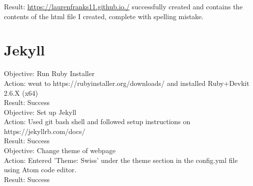\documentclass{article}
\begin{document}
\noindent Result: \href{https://laurenfranks11.github.io./}{https://laurenfranks11.github.io./} successfully created and contains the contents of the html file I created, complete with spelling mistake.\\ 

\section{Jekyll}
Objective: Run Ruby Installer \\
Action: went to https://rubyinstaller.org/downloads/ and installed Ruby+Devkit 2.6.X (x64)  \\
Result: Success\\

Objective: Set up Jekyll\\
Action: Used git bash shell and followed setup instructions on https://jekyllrb.com/docs/ \\
Result: Success\\

Objective: Change theme of webpage\\
Action: Entered 'Theme: Swiss' under the theme section in the config.yml file using Atom code editor.\\ 
Result: Success\\
\end{document}
